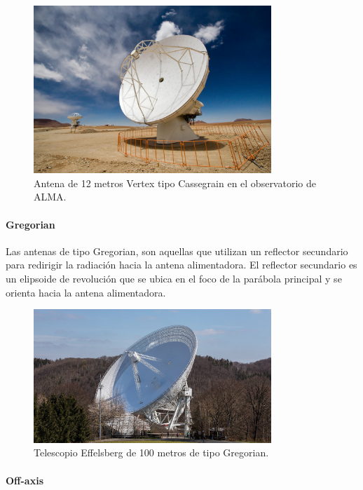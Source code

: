 \begin{figure}
    \centering
    \includegraphics[width = 0.8\textwidth]{img/cassegrain.jpg}
    \caption{Antena de 12 metros Vertex tipo Cassegrain en el observatorio de ALMA.}
    \label{fig:cass}
\end{figure}

\paragraph{Gregorian}

Las antenas de tipo Gregorian, son aquellas que utilizan un reflector secundario para redirigir la radiación hacia la antena alimentadora. El reflector secundario es un elipsoide de revolución que se ubica en el foco de la parábola principal y se orienta hacia la antena alimentadora.

\begin{figure}
    \centering
    \includegraphics[width = 0.8\textwidth]{img/gregorian.jpg}
    \caption{Telescopio Effelsberg de 100 metros de tipo Gregorian.}
    \label{fig:greg}
\end{figure}

\paragraph{Off-axis}

